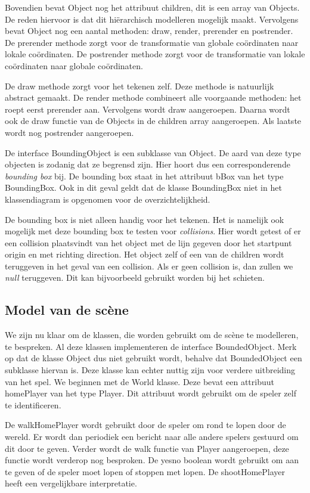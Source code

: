 \documentclass[a4paper,11pt]{article}
\begin{document}
Bovendien bevat Object nog het attribuut children, dit is een array van Objects. De reden hiervoor is dat dit hi\"erarchisch modelleren mogelijk maakt. Vervolgens bevat Object nog een aantal methoden: draw, render, prerender en postrender. De prerender methode zorgt voor de transformatie van globale co\"ordinaten naar lokale co\"ordinaten. De postrender methode zorgt voor de transformatie van lokale co\"ordinaten naar globale co\"ordinaten.

De draw methode zorgt voor het tekenen zelf. Deze methode is natuurlijk abstract gemaakt. De render methode combineert alle voorgaande methoden: het roept eerst prerender aan. Vervolgens wordt draw aangeroepen. Daarna wordt ook de draw functie van de Objects in de children array aangeroepen. Als laatste wordt nog postrender aangeroepen.

De interface BoundingObject is een subklasse van Object. De aard van deze type objecten is zodanig dat ze begrensd zijn. Hier hoort dus een corresponderende \emph{bounding box} bij. De bounding box staat in het attribuut bBox van het type BoundingBox. Ook in dit geval geldt dat de klasse BoundingBox niet in het klassendiagram is opgenomen voor de overzichtelijkheid.

De bounding box is niet alleen handig voor het tekenen. Het is namelijk ook mogelijk met deze bounding box te testen voor \emph{collisions}. Hier wordt getest of er een collision plaatsvindt van het object met de lijn gegeven door het startpunt origin en met richting direction. Het object zelf of een van de children wordt teruggeven in het geval van een collision. Als er geen collision is, dan zullen we \emph{null} teruggeven. Dit kan bijvoorbeeld gebruikt worden bij het schieten.

\subsection{Model van de sc\`ene}
    \label{sec:model}
We zijn nu klaar om de klassen, die worden gebruikt om de sc\`ene te modelleren, te bespreken.  Al deze klassen implementeren de interface BoundedObject. Merk op dat de klasse Object dus niet gebruikt wordt, behalve dat BoundedObject een subklasse hiervan is. Deze klasse kan echter nuttig zijn voor verdere uitbreiding van het spel. We beginnen met de World klasse. Deze bevat een attribuut homePlayer van het type Player. Dit attribuut wordt gebruikt om de speler zelf te identificeren.

De walkHomePlayer wordt gebruikt door de speler om rond te lopen door de wereld. Er wordt dan periodiek een bericht naar alle andere spelers gestuurd om dit door te geven. Verder wordt de walk functie van Player aangeroepen, deze functie wordt verderop nog besproken. De yesno boolean wordt gebruikt om aan te geven of de speler moet lopen of stoppen met lopen. De shootHomePlayer heeft een vergelijkbare interpretatie.
\end{document}
